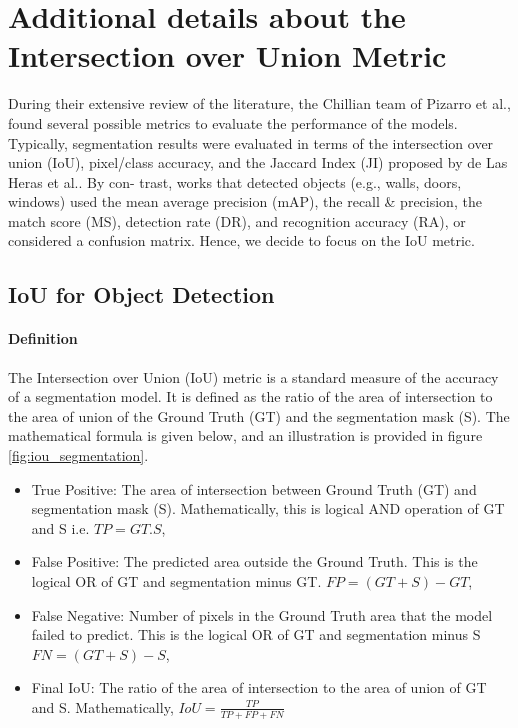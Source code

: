 \documentclass[11pt]{article}
\begin{document}

\section{Additional details about the Intersection over Union Metric}
\label{app:sec:IoUdetails}
During their extensive review of the literature, the Chillian team of
Pizarro et al.\cite{PIZARRO2022104348}, 
found several possible
metrics to evaluate the performance of the models. 
 Typically, segmentation results were evaluated in terms
of the intersection over union (IoU), pixel/class accuracy, and
the Jaccard Index (JI) proposed by de Las Heras et al.. By con-
trast, works that detected objects (e.g., walls, doors, windows) used
the mean average precision (mAP), the recall \& precision, the match
score (MS), detection rate (DR), and recognition accuracy (RA),
or considered a confusion matrix.
Hence, we decide to focus on the IoU metric.

\subsection{IoU for Object Detection}
\paragraph{Definition} The Intersection over Union (IoU) metric is a standard
measure of the accuracy of a segmentation model. It is defined as the ratio of
the area of intersection to the area of union of the Ground Truth (GT) and the 
segmentation mask (S). The mathematical formula is given below, and an illustration
is provided in figure \ref{fig:iou_segmentation}.

\begin{itemize}
    \item True Positive: The area of intersection between Ground Truth (GT) and segmentation mask (S). Mathematically, this is logical AND operation of GT and S i.e.
    $TP = GT.S$,
    \item False Positive: The predicted area outside the Ground Truth. This is the logical OR of GT and segmentation minus GT.
    $FP=(GT+S) - GT$,
    \item False Negative: Number of pixels in the Ground Truth area that the model failed to predict. This is the logical OR of GT and segmentation minus S
    $FN=(GT+S) -S$,
    \item Final IoU: The ratio of the area of intersection to the area of union of GT and S. Mathematically,
    $IoU = \frac{TP}{TP+FP+FN}$
\end{itemize}
\end{document}
